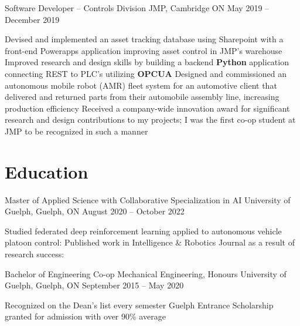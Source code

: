 \documentclass[a4paper,11pt]{article}
\begin{document}
\begin{subheading}
	\newpage
	\resumeExp
	{Software Developer -- Controls Division}
	{JMP, Cambridge ON}
	{May 2019 -- December 2019}
	{}
	\begin{entries}
		\ib Devised and implemented an asset tracking database using Sharepoint with a front-end
		Powerapps application improving asset control in JMP's warehouse
		\ib Improved research and design skills by building a backend \textbf{Python} application connecting REST
		to PLC's utilizing \textbf{OPCUA}
		\ib Designed and commissioned an autonomous mobile robot (AMR) fleet system for an automotive client that delivered and
		returned parts from their automobile assembly line, increasing production efficiency
		\ib Received a company-wide innovation award for significant research and design contributions to
		my projects; I was the first co-op student at JMP to be recognized in such a manner
	\end{entries}

\end{subheading}
\sectionsep
\section{Education}

\begin{subheading}
	\resumeEdu
	{Master of Applied Science with Collaborative Specialization in AI}
	{University of Guelph, Guelph, ON}
	{August 2020 -- October 2022} %
	{}
	\begin{entries}
		\ib Studied federated deep reinforcement learning applied to autonomous vehicle platoon control:
		\href{https://atrium.lib.uoguelph.ca/xmlui/handle/10214/27063}{\footnotesize{\faExternalLink}}
		\ib Published work in Intelligence \& Robotics Journal as a result of research success:
		\href{https://intellrobot.com/article/view/4885}{\footnotesize{\faExternalLink}}
	\end{entries}

	\resumeEdu
	{Bachelor of Engineering Co-op Mechanical Engineering, Honours }
	{University of Guelph, Guelph, ON}
	{September 2015 -- May 2020}
	{}

	\begin{entries}
		\ib Recognized on the Dean's list every semester
		\ib Guelph Entrance Scholarship granted for admission with over 90\% average
	\end{entries}
\end{subheading}
\sectionsep

\end{document}
